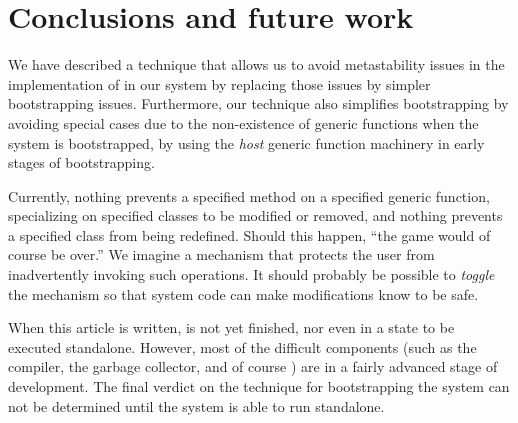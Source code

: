 \section{Conclusions and future work}

We have described a technique that allows us to avoid metastability
issues in the implementation of \clos{} in our system \sicl{} by
replacing those issues by simpler bootstrapping issues.  Furthermore,
our technique also simplifies bootstrapping by avoiding special cases
due to the non-existence of generic functions when the system is
bootstrapped, by using the \emph{host} generic function machinery
in early stages of bootstrapping. 

Currently, nothing prevents a specified method on a specified generic
function, specializing on specified classes to be modified or removed,
and nothing prevents a specified class from being redefined.  Should
this happen, ``the game would of course be over.''  We imagine a
mechanism that protects the user from inadvertently invoking such
operations.  It should probably be possible to \emph{toggle} the
mechanism so that system code can make modifications know to be safe.

When this article is written, \sicl{} is not yet finished, nor even in
a state to be executed standalone.  However, most of the difficult
components (such as the compiler, the garbage collector, and of course
\clos{}) are in a fairly advanced stage of development.  The final
verdict on the technique for bootstrapping the system can not be
determined until the system is able to run standalone.

